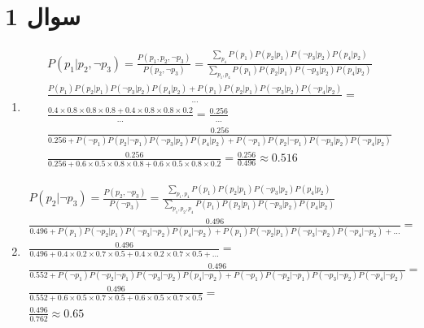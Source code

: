 \section*{سوال 1}
\begin{enumerate}
    \item \phantom{متن}
    \begin{gather*}
        P(p_1 | p_2, \neg p_3) = \frac{P(p_1, p_2, \neg p_3)}{P(p_2, \neg p_3)} = \frac{\sum_{p_4} P(p_1) P(p_2 | p_1) P(\neg p_3 | p_2) P(p_4 | p_2)}{\sum_{p_1, p_4} P(p_1) P(p_2 | p_1) P(\neg p_3 | p_2) P(p_4 | p_2)}\\
        \frac{P(p_1) P(p_2 | p_1) P(\neg p_3 | p_2) P(p_4 | p_2) + P(p_1) P(p_2 | p_1) P(\neg p_3 | p_2) P(\neg p_4 | p_2)}{\dots} =\\
        \frac{0.4 \times 0.8 \times 0.8 \times 0.8 + 0.4 \times 0.8 \times 0.8 \times 0.2}{\dots} = \frac{0.256}{\dots}\\
        \frac{0.256}{0.256 + P(\neg p_1) P(p_2 | \neg p_1) P(\neg p_3 | p_2) P(p_4 | p_2) + P(\neg p_1) P(p_2 | \neg p_1) P(\neg p_3 | p_2) P(\neg p_4 | p_2)}\\
        \frac{0.256}{0.256 + 0.6 \times 0.5 \times 0.8 \times 0.8 + 0.6 \times 0.5 \times 0.8 \times 0.2} = \frac{0.256}{0.496} \approx 0.516
    \end{gather*}
    \item \phantom{متن}
    \begin{gather*}
        P(p_2 | \neg p_3) = \frac{P(p_2, \neg p_3)}{P(\neg p_3)} = \frac{\sum_{p_1, p_4} P(p_1) P(p_2 | p_1) P(\neg p_3 | p_2) P(p_4 | p_2)}{\sum_{p_1, p_2, p_4} P(p_1) P(p_2 | p_1) P(\neg p_3 | p_2) P(p_4 | p_2)}\\
        \frac{0.496}{0.496 + P(p_1) P(\neg p_2 | p_1) P(\neg p_3 | \neg p_2) P(p_4 | \neg p_2) + P(p_1) P(\neg p_2 | p_1) P(\neg p_3 | \neg p_2) P(\neg p_4 | \neg p_2) + \dots} =\\
        \frac{0.496}{0.496 + 0.4 \times 0.2 \times 0.7 \times 0.5 + 0.4 \times 0.2 \times 0.7 \times 0.5 + \dots} =\\
        \frac{0.496}{0.552 + P(\neg p_1) P(\neg p_2 | \neg p_1) P(\neg p_3 | \neg p_2) P(p_4 | \neg p_2) + P(\neg p_1) P(\neg p_2 | \neg p_1) P(\neg p_3 | \neg p_2) P(\neg p_4 | \neg p_2)} =\\
        \frac{0.496}{0.552 + 0.6 \times 0.5 \times 0.7 \times 0.5 + 0.6 \times 0.5 \times 0.7 \times 0.5} =\\
        \frac{0.496}{0.762} \approx 0.65
    \end{gather*}

\end{enumerate}
